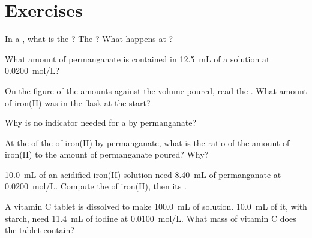 \section{Exercises}


\begin{exercise}[$\star$]\label{exo:g11:titration:1}
In a , what is the ? The ? What happens
at ?
\end{exercise}

\begin{exercise}[$\star$]\label{exo:g11:titration:2}
What amount of permanganate  is contained in \qty{12.5}{mL} of a
solution at \qty{0.0200}{mol/L}?
\end{exercise}

\begin{exercise}[$\star$]\label{exo:g11:titration:3}
On the figure of the amounts against the volume poured, read the
. What amount of iron(II) was in the flask at the
start?
\end{exercise}

\begin{exercise}[$\star$]\label{exo:g11:titration:4}
Why is no indicator needed for a  by permanganate?
\end{exercise}

\begin{exercise}[$\star$]\label{exo:g11:titration:5}
At the  of the  of iron(II) by permanganate, what is
the ratio of the amount of iron(II) to the amount of permanganate
poured? Why?
\end{exercise}

\begin{exercise}[$\star\star$]\label{exo:g11:titration:6}
\qty{10.0}{mL} of an acidified iron(II) solution need \qty{8.40}{mL} of
permanganate at \qty{0.0200}{mol/L}. Compute the  of
iron(II), then its .
\end{exercise}

\begin{exercise}[$\star\star$]\label{exo:g11:titration:7}
A vitamin C tablet is dissolved to make \qty{100.0}{mL} of solution.
\qty{10.0}{mL} of it, with starch, need \qty{11.4}{mL} of iodine at
\qty{0.0100}{mol/L}. What mass of vitamin C does the tablet contain?
\end{exercise}

